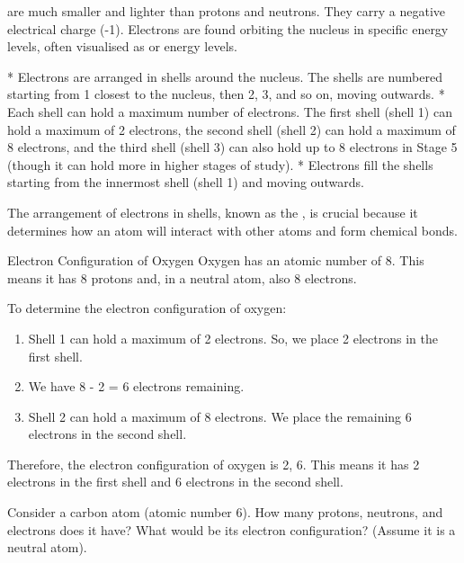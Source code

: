 
 are much smaller and lighter than protons and neutrons. They carry a negative electrical charge (-1). Electrons are found orbiting the nucleus in specific energy levels, often visualised as  or energy levels.

* Electrons are arranged in shells around the nucleus. The shells are numbered starting from 1 closest to the nucleus, then 2, 3, and so on, moving outwards.
* Each shell can hold a maximum number of electrons. The first shell (shell 1) can hold a maximum of 2 electrons, the second shell (shell 2) can hold a maximum of 8 electrons, and the third shell (shell 3) can also hold up to 8 electrons in Stage 5 (though it can hold more in higher stages of study).
* Electrons fill the shells starting from the innermost shell (shell 1) and moving outwards.

The arrangement of electrons in shells, known as the , is crucial because it determines how an atom will interact with other atoms and form chemical bonds.

\begin{example}{Electron Configuration of Oxygen}
Oxygen has an atomic number of 8. This means it has 8 protons and, in a neutral atom, also 8 electrons.

To determine the electron configuration of oxygen:
\begin{enumerate}
    \item Shell 1 can hold a maximum of 2 electrons. So, we place 2 electrons in the first shell.
    \item We have 8 - 2 = 6 electrons remaining.
    \item Shell 2 can hold a maximum of 8 electrons. We place the remaining 6 electrons in the second shell.
\end{enumerate}
Therefore, the electron configuration of oxygen is 2, 6. This means it has 2 electrons in the first shell and 6 electrons in the second shell.
\end{example}

\begin{stopandthink}
Consider a carbon atom (atomic number 6). How many protons, neutrons, and electrons does it have? What would be its electron configuration? (Assume it is a neutral atom).
\end{stopandthink}

